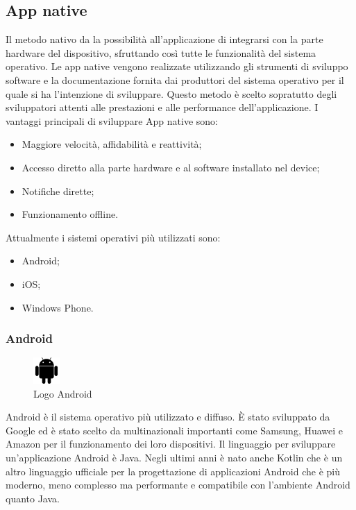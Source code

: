 \subsection{App native}
Il metodo nativo da la possibilità all'applicazione di integrarsi con la parte hardware del dispositivo, sfruttando così tutte le funzionalità del sistema operativo.
Le app native vengono realizzate utilizzando gli strumenti di sviluppo software e la documentazione fornita dai produttori del sistema operativo per il quale si ha l'intenzione di sviluppare.
Questo metodo è scelto sopratutto degli sviluppatori attenti alle prestazioni e alle performance dell'applicazione.
I vantaggi principali di sviluppare App native sono:
\begin{itemize}
	\item Maggiore velocità, affidabilità e reattività;
	\item Accesso diretto alla parte hardware e al software installato nel device; 
	\item Notifiche dirette;
	\item Funzionamento offline.
\end{itemize}
Attualmente i sistemi operativi più utilizzati sono:
\begin{itemize}
	\item Android; 
	\item iOS; 
	\item Windows Phone.\\
\end{itemize}


\subsubsection{Android}
\begin{figure}[htbp]	
	\centering
	\includegraphics[width=1cm]{immagini/logoandroid.png}
	\caption{Logo Android}
	\label{fig:Logo Android}
\end{figure}
 Android è il sistema operativo più utilizzato e diffuso. È stato sviluppato da Google ed è stato scelto da multinazionali importanti come Samsung, Huawei e Amazon per il funzionamento dei loro dispositivi.
 Il linguaggio per sviluppare un'applicazione Android è Java. Negli ultimi anni è nato anche Kotlin che è un altro linguaggio ufficiale per la progettazione di applicazioni Android che è più moderno, meno complesso ma performante e compatibile con l'ambiente Android quanto Java.
 \newpage

